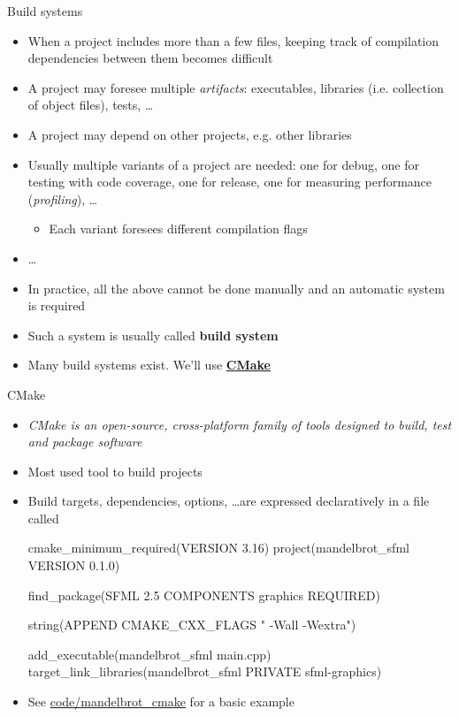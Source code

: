 \begin{frame}{Build systems}

  \begin{itemize}
  \item When a project includes more than a few files, keeping track of
    compilation dependencies between them becomes difficult
  \item A project may foresee multiple \textit{artifacts}: executables,
    libraries (i.e. collection of object files), tests, \ldots
  \item A project may depend on other projects, e.g. other libraries
  \item Usually multiple variants of a project are needed: one for debug, one
    for testing with code coverage, one for release, one for measuring
    performance (\textit{profiling}), \ldots
    \begin{itemize}
    \item Each variant foresees different compilation flags
    \end{itemize}
  \item \ldots
  \end{itemize}

  \begin{itemize}
  \item In practice, all the above cannot be done manually and an automatic
    system is required
  \item Such a system is usually called \textbf{build system}
  \item Many build systems exist. We'll use
    \href{https://cmake.org}{\textbf{CMake}}
  \end{itemize}

\end{frame}

\begin{frame}[fragile]{CMake}
  \begin{itemize}
  \item \textit{CMake is an open-source, cross-platform family of tools designed
      to build, test and package software}
  \item Most used tool to build \Cpp{} projects
  \item Build targets, dependencies, options, \ldots are expressed declaratively
    in a file called 
    \begin{codeblock}{
cmake_minimum_required(VERSION 3.16)
project(mandelbrot_sfml VERSION 0.1.0)

find_package(SFML 2.5 COMPONENTS graphics REQUIRED)

string(APPEND CMAKE_CXX_FLAGS " -Wall -Wextra")

add_executable(mandelbrot_sfml main.cpp)
target_link_libraries(mandelbrot_sfml PRIVATE sfml-graphics)
}\end{codeblock}

  \item See
    \href{https://github.com/Programmazione-per-la-Fisica/pf2023/tree/main/code/mandelbrot\_cmake}{code/mandelbrot\_cmake}
    for a basic example
  \end{itemize}
\end{frame}
